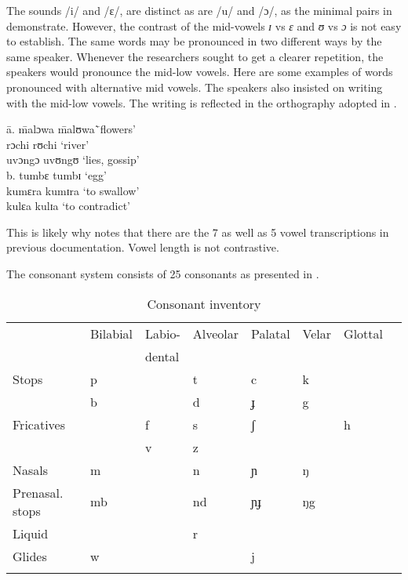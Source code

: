 \documentclass[output=paper,colorlinks,citecolor=brown]{langscibook}
\begin{document}
The sounds /i/ and /ɛ/, are distinct as are /u/ and /ɔ/, as the minimal pairs  in  demonstrate. However, the contrast of the mid-vowels  \textit{ɪ} vs \textit{ɛ} and \textit{ʊ} vs \textit{ɔ} is not  easy to establish. The  same words may be pronounced  in two different ways by the same speaker. Whenever  the researchers sought  to get a clearer  repetition,  the speakers would  pronounce  the mid-low vowels. Here are some examples of words pronounced with alternative mid vowels. The  speakers also insisted  on writing  with  the mid-low vowels. The writing  is reflected  in the orthography adopted in \citet{RugemaliraEtAl2019}.

\ea%
    \label{ex:ngonyani:2}
    \begin{tabbing}
        \= a. \quad\= malɔwa \quad\= malʊwa\quad\= `flowers'\\
        \> \> rɔchi \> rʊchi  \>  `river' \\
        \> \> uvɔngɔ \> uvʊngʊ \> `lies, gossip'\\
        \> b. \>  tumbɛ \> tumbɪ \> `egg' \\
        \> \> kumɛra \> kumɪra \> `to swallow'\\
        \> \> kulɛa \> kulɪa \> `to contradict'
    \end{tabbing}
\z

This is likely why \citet{Nurse2000} notes that there are the 7 as well as 5 vowel transcriptions in previous documentation. Vowel length is not contrastive.

The consonant system consists of 25 consonants as presented in . 

\begin{table}
	\caption {Consonant inventory \citep[5]{RugemaliraEtAl2019} }
 	\label{tab:ngonyani:2}
    \begin{tabular}{llllllll}
    \lsptoprule 
        & Bilabial & Labio-  & Alveolar & Palatal & Velar & Glottal\\
        & & dental\\
    \midrule
        Stops & p & & t & c & k\\
        & b &  &   d & ɟ & g\\
        Fricatives & & f &   s & ʃ & & h\\
        & & v &   z\\
        Nasals & m & &    n & ɲ & ŋ\\
        Prenasal. stops & mb & &  nd & ɲɟ & ŋg \\
        Liquid & & &    r\\
        Glides & w & &    & j\\
    \lspbottomrule
    \end{tabular}
\end{table}
\end{document}
